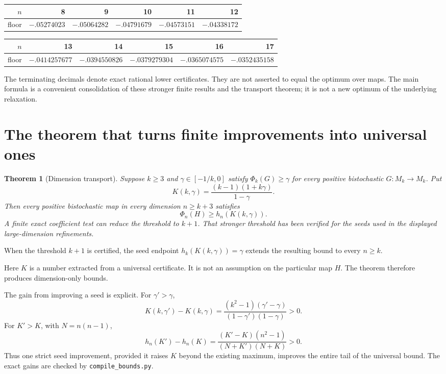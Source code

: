 \documentclass[11pt]{article}
\newtheorem{theorem}{Theorem}
\begin{document}
\begin{center}
\begin{tabular}{rrrrrr}
\toprule
$n$&8&9&10&11&12\\
\midrule
floor&$-.05274023$&$-.05064282$&$-.04791679$&$-.04573151$&$-.04338172$\\
\bottomrule
\end{tabular}
\end{center}
\begin{center}
\begin{tabular}{rrrrrr}
\toprule
$n$&13&14&15&16&17\\
\midrule
floor&$-.0414257677$&$-.0394550826$&$-.0379279304$&$-.0365074575$&$-.0352435158$\\
\bottomrule
\end{tabular}
\end{center}
The terminating decimals denote exact rational lower certificates. They are
not asserted to equal the optimum over maps. The main formula is a convenient
consolidation of these stronger finite results and the transport theorem;
it is not a new optimum of the underlying relaxation.

\section{The theorem that turns finite improvements into universal ones}
\begin{theorem}[Dimension transport]
Suppose $k\ge3$ and $\gamma\in[-1/k,0]$ satisfy
$\Phi_k(G)\ge\gamma$ for every positive bistochastic $G:M_k\to M_k$.
Put
\[
 K(k,\gamma)=\frac{(k-1)(1+k\gamma)}{1-\gamma}.
\]
Then every positive bistochastic map in every dimension $n\ge k+3$ satisfies
\[
 \boxed{\Phi_n(H)\ge h_n(K(k,\gamma)).}
\]
A finite exact coefficient test can reduce the threshold to $k+1$.
That stronger threshold has been verified for the seeds used in the displayed
large-dimension refinements.
\end{theorem}
When the threshold $k+1$ is certified, the seed endpoint
$h_k(K(k,\gamma))=\gamma$ extends the resulting bound to every $n\ge k$.

Here $K$ is a number extracted from a universal certificate. It is not an
assumption on the particular map $H$. The theorem therefore produces
dimension-only bounds.

The gain from improving a seed is explicit. For $\gamma'>\gamma$,
\[
 K(k,\gamma')-K(k,\gamma)
 =\frac{(k^2-1)(\gamma'-\gamma)}{(1-\gamma')(1-\gamma)}>0.
\]
For $K'>K$, with $N=n(n-1)$,
\[
 \boxed{h_n(K')-h_n(K)
 =\frac{(K'-K)(n^2-1)}{(N+K')(N+K)}>0.}
\]
Thus one strict seed improvement, provided it raises $K$ beyond the existing
maximum, improves the entire tail of the universal bound. The exact gains
are checked by \texttt{compile\_bounds.py}.
\end{document}
